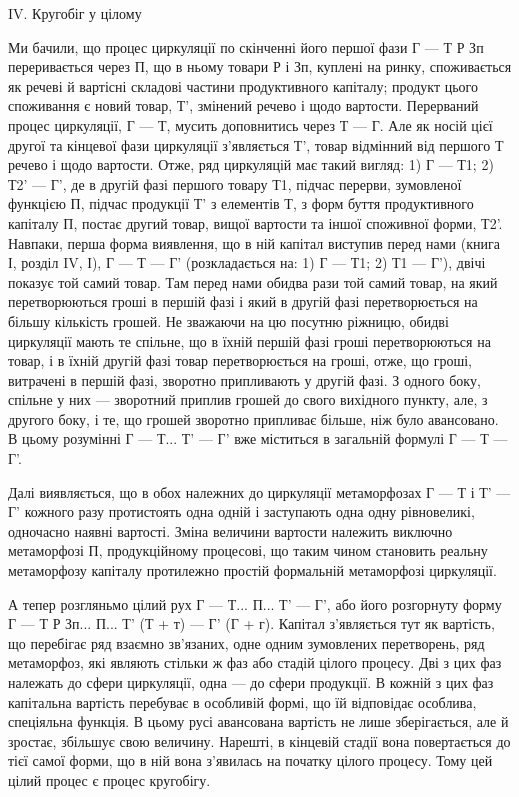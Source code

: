 IV. Кругобіг у цілому

Ми бачили, що процес циркуляції по скінченні його першої фази
Г — Т Р Зп переривається через П, що в ньому товари Р і Зп, куплені
на ринку, споживається як речеві й вартісні складові частини продуктивного
капіталу; продукт цього споживання є новий товар, Т', змінений
речево і щодо вартости. Перерваний процес циркуляції, Г — Т, мусить
доповнитись через Т — Г. Але як носій цієї другої та кінцевої фази циркуляції
з’являється Т', товар відмінний від першого Т речево і щодо
вартости. Отже, ряд циркуляцій має такий вигляд: 1) Г — Т1; 2) Т2' — Г',
де в другій фазі першого товару Т1, підчас перерви, зумовленої функцією
П, підчас продукції Т' з елементів Т, з форм буття продуктивного
капіталу П, постає другий товар, вищої вартости та іншої споживної
форми, Т2'. Навпаки, перша форма виявлення, що в ній капітал виступив
перед нами (книга І, розділ IV, І), Г — Т — Г' (розкладається
на: 1) Г — Т1; 2) Т1 — Г'), двічі показує той самий товар. Там перед
нами обидва рази той самий товар, на який перетворюються гроші
в першій фазі і який в другій фазі перетворюється на більшу кількість
грошей. Не зважаючи на цю посутню ріжницю, обидві циркуляції мають
те спільне, що в їхній першій фазі гроші перетворюються на товар, і
в їхній другій фазі товар перетворюється на гроші, отже, що гроші, витрачені
в першій фазі, зворотно припливають у другій фазі. З одного боку,
спільне у них — зворотний приплив грошей до свого вихідного пункту,
але, з другого боку, і те, що грошей зворотно припливає більше, ніж було
авансовано. В цьому розумінні Г — Т... Т' — Г' вже міститься в загальній
формулі Г — Т — Г'.

Далі виявляється, що в обох належних до циркуляції метаморфозах
Г — Т і Т' — Г' кожного разу протистоять одна одній і заступають одна
одну рівновеликі, одночасно наявні вартості. Зміна величини вартости
належить виключно метаморфозі П, продукційному процесові, що таким
чином становить реальну метаморфозу капіталу протилежно простій формальній
метаморфозі циркуляції.

А тепер розгляньмо цілий рух Г — Т... П... Т' — Г', або його розгорнуту
форму Г — Т Р Зп... П... Т' (Т + т) — Г' (Г + г). Капітал з’являється тут
як вартість, що перебігає ряд взаємно зв’язаних, одне одним зумовлених
перетворень, ряд метаморфоз, які являють стільки ж фаз або стадій цілого
процесу. Дві з цих фаз належать до сфери циркуляції, одна — до
сфери продукції. В кожній з цих фаз капітальна вартість перебуває в
особливій формі, що їй відповідає особлива, спеціяльна функція. В цьому
русі авансована вартість не лише зберігається, але й зростає, збільшує
свою величину. Нарешті, в кінцевій стадії вона повертається до тієї самої
форми, що в ній вона з’явилась на початку цілого процесу. Тому цей
цілий процес є процес кругобігу.
